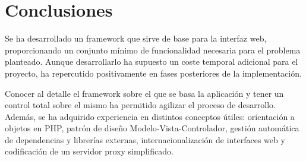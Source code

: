\section{Conclusiones\label{extra:mvc:conclusiones}}

Se ha desarrollado un \gls{framework} que sirve de base para la interfaz web, proporcionando un conjunto mínimo de funcionalidad necesaria para el problema planteado. Aunque desarrollarlo ha supuesto un coste temporal adicional para el proyecto, ha repercutido positivamente en fases posteriores de la implementación.

Conocer al detalle el \gls{framework} sobre el que se basa la aplicación y tener un control total sobre el mismo ha permitido agilizar el proceso de desarrollo. Además, se ha adquirido experiencia en distintos conceptos útiles: orientación a objetos en \gls{PHP}, patrón de diseño Modelo-Vista-Controlador, gestión automática de dependencias y librerías externas, internacionalización de interfaces web y codificación de un servidor \gls{proxy} simplificado.